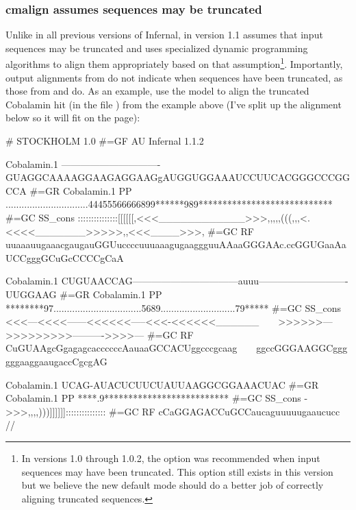 \subsubsection{cmalign assumes sequences may be truncated}
Unlike in all previous versions of Infernal,  in version
1.1 assumes that input sequences may be truncated and uses specialized
dynamic programming algorithms to align them appropriately based on
that assumption\footnote{In versions 1.0 through 1.0.2, the
    option was recommended when input
  sequences may have been truncated. This option still exists in this
  version but we believe the new default mode should do a better job
  of correctly aligning truncated sequences.}. Importantly, output
alignments from  do not indicate when sequences have
been truncated, as those from  and  do. As
an example, use the  model to align the
truncated Cobalamin hit (in the file )
from the  example above (I've split up the alignment
below so it will fit on the page):


\label{cmalign-cobalamin}
\begin{sreoutput}
# STOCKHOLM 1.0
#=GF AU Infernal 1.1.2

Cobalamin.1         -------------------------------GUAGGCAAAAGGAAGAGGAAGgAUGGUGGAAAUCCUUCACGGGCCCGGCCA
#=GR Cobalamin.1 PP ...............................44455566666899******989****************************
#=GC SS_cons        :::::::::::::::[[[[[[,<<<____________>>>,,,,,(((,,,<.<<<<_______>>>>>,,<<<____>>>,
#=GC RF             uuaaauugaaacgaugauGGUuccccuuuaaagugaaggguuAAaaGGGAAc.ccGGUGaaAaUCCgggGCuGcCCCCgCaA

Cobalamin.1         CUGUAACCAG---------------------------------auuu----------------------------UUGGAAG
#=GR Cobalamin.1 PP ********97.................................5689............................79*****
#=GC SS_cons        <<<---<<<<------<<<<<<-----<<<-<<<<<<______~~~~>>>>>>--->>>>>>>>>---------->>>>---
#=GC RF             CuGUAAgcGgagagcaccccccAauaaGCCACUggcccgcaag~~~~ggccGGGAAGGCggggggaaggaaugaccCgcgAG

Cobalamin.1         UCAG-AUACUCUUCUAUUAAGGCGGAAACUAC
#=GR Cobalamin.1 PP ****.9**************************
#=GC SS_cons        ->>>,,,,)))]]]]]]:::::::::::::::
#=GC RF             cCaGGAGACCuGCCaucaguuuuugaaucucc
//
\end{sreoutput}

